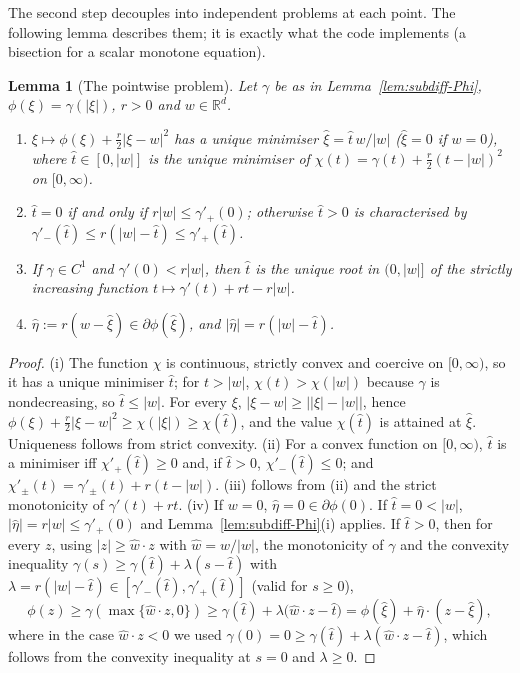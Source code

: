 \documentclass[11pt]{amsart}
\newtheorem{lemma}[theorem]{Lemma}
\theoremstyle{definition}
\theoremstyle{remark}
\numberwithin{equation}{section}
\newcommand{\R}{\mathbb{R}}
\newcommand{\abs}[1]{\lvert #1\rvert}
\begin{document}
The second step decouples into independent problems at each point. The following lemma describes them; it is exactly what the code implements (a bisection for a scalar monotone equation).

\begin{lemma}[The pointwise problem]\label{lem:pointwise-prox}
Let $\gamma$ be as in Lemma~\ref{lem:subdiff-Phi}, $\phi(\xi)=\gamma(\abs\xi)$, $r>0$ and $w\in\R^d$.
\begin{enumerate}[label=\textup{(\roman*)}]
\item $\xi\mapsto\phi(\xi)+\frac r2\abs{\xi-w}^2$ has a unique minimiser $\hat\xi=\hat t\,w/\abs w$ \textup($\hat\xi=0$ if $w=0$\textup), where $\hat t\in[0,\abs w]$ is the unique minimiser of $\chi(t)=\gamma(t)+\frac r2(t-\abs w)^2$ on $[0,\infty)$.
\item $\hat t=0$ if and only if $r\abs w\le\gamma'_+(0)$; otherwise $\hat t>0$ is characterised by $\gamma'_-(\hat t)\le r(\abs w-\hat t)\le\gamma'_+(\hat t)$.
\item If $\gamma\in C^1$ and $\gamma'(0)<r\abs w$, then $\hat t$ is the unique root in $(0,\abs w]$ of the strictly increasing function $t\mapsto\gamma'(t)+rt-r\abs w$.
\item $\hat\eta:=r(w-\hat\xi)\in\partial\phi(\hat\xi)$, and $\abs{\hat\eta}=r(\abs w-\hat t)$.
\end{enumerate}
\end{lemma}
\begin{proof}
(i) The function $\chi$ is continuous, strictly convex and coercive on $[0,\infty)$, so it has a unique minimiser $\hat t$; for $t>\abs w$, $\chi(t)>\chi(\abs w)$ because $\gamma$ is nondecreasing, so $\hat t\le\abs w$. For every $\xi$, $\abs{\xi-w}\ge\big|\abs\xi-\abs w\big|$, hence $\phi(\xi)+\frac r2\abs{\xi-w}^2\ge\chi(\abs\xi)\ge\chi(\hat t)$, and the value $\chi(\hat t)$ is attained at $\hat\xi$. Uniqueness follows from strict convexity. (ii) For a convex function on $[0,\infty)$, $\hat t$ is a minimiser iff $\chi'_+(\hat t)\ge0$ and, if $\hat t>0$, $\chi'_-(\hat t)\le0$; and $\chi'_\pm(t)=\gamma'_\pm(t)+r(t-\abs w)$. (iii) follows from (ii) and the strict monotonicity of $\gamma'(t)+rt$. (iv) If $w=0$, $\hat\eta=0\in\partial\phi(0)$. If $\hat t=0<\abs w$, $\abs{\hat\eta}=r\abs w\le\gamma'_+(0)$ and Lemma~\ref{lem:subdiff-Phi}(i) applies. If $\hat t>0$, then for every $z$, using $\abs z\ge\hat w\cdot z$ with $\hat w=w/\abs w$, the monotonicity of $\gamma$ and the convexity inequality $\gamma(s)\ge\gamma(\hat t)+\lambda(s-\hat t)$ with $\lambda=r(\abs w-\hat t)\in[\gamma'_-(\hat t),\gamma'_+(\hat t)]$ (valid for $s\ge0$),
\[
\phi(z)\ge\gamma(\max\{\hat w\cdot z,0\})\ge\gamma(\hat t)+\lambda\big(\hat w\cdot z-\hat t\big)=\phi(\hat\xi)+\hat\eta\cdot(z-\hat\xi),
\]
where in the case $\hat w\cdot z<0$ we used $\gamma(0)=0\ge \gamma(\hat t)+\lambda(\hat w\cdot z-\hat t)$, which follows from the convexity inequality at $s=0$ and $\lambda\ge0$.
\end{proof}
\end{document}
